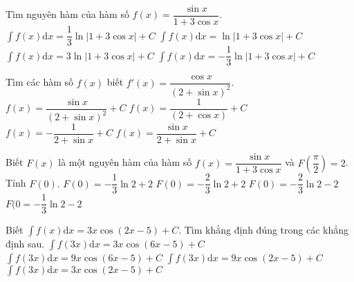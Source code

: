 \begin{ex}
	Tìm nguyên hàm của hàm số $ f(x)=\dfrac{\sin x}{1+3\cos x}$.
	\choice
	{$\displaystyle\int{f(x)}\mathrm{d}x=\dfrac{1}{3}\ln \left| 1+3\cos x\right|+C$}
	{$\displaystyle\int{f(x)}\mathrm{d}x=\ln \left| 1+3\cos x\right|+C$}
	{$\displaystyle\int{f(x)}\mathrm{d}x=3\ln \left| 1+3\cos x\right|+C$}
	{\True $\displaystyle\int{f(x)}\mathrm{d}x=-\dfrac{1}{3}\ln \left| 1+3\cos x\right|+C$}
\end{ex}
\begin{ex}
	Tìm các hàm số $ f(x)$ biết $f'(x)=\dfrac{\cos x}{(2+\sin x)^2}$.
	\choice
	{$ f(x)=\dfrac{\sin x}{(2+\sin x)^2}+C$}
	{$ f(x)=\dfrac{1}{(2+\cos x)}+C$}
	{\True $ f(x)=-\dfrac{1}{2+\sin x}+C$}
	{$ f(x)=\dfrac{\sin x}{2+\sin x}+C$}
\end{ex}
\begin{ex}
	Biết $F(x)$ là một nguyên hàm của hàm số $ f(x)=\dfrac{\sin x}{1+3\cos x}$ và $F\left(\dfrac{\pi}{2}\right)=2$. Tính $F(0).$ 
	\choice
	{$ F(0)=-\dfrac{1}{3}\ln 2+2$}
	{\True $ F(0)=-\dfrac{2}{3}\ln 2+2$}
	{$ F(0)=-\dfrac{2}{3}\ln 2-2$}
	{$ F(0=-\dfrac{1}{3}\ln 2-2$}
\end{ex}
\begin{ex}
	Biết $\displaystyle\int{f(x)\mathrm{d}x=3x\cos\left(2x-5\right)+C}$. Tìm khẳng định đúng trong các khẳng định sau.
	\choice
	{\True $\displaystyle\int{f\left(3x\right)\mathrm{d}x=3x\cos\left(6x-5\right)+C}$}
	{$\displaystyle\int{f\left(3x\right)\mathrm{d}x=9x\cos\left(6x-5\right)+C}$}
	{$\displaystyle\int{f\left(3x\right)\mathrm{d}x=9x\cos\left(2x-5\right)+C}$}
	{$\displaystyle\int{f\left(3x\right)\mathrm{d}x=3x\cos\left(2x-5\right)+C}$}
\end{ex}
